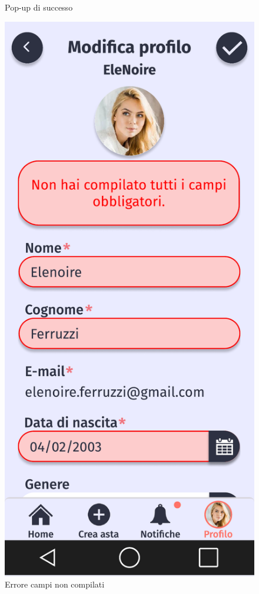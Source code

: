 \begin{figure}[!htb]
\begin{minipage}{0.32\textwidth}
                    \caption{Pop-up di successo}
            \end{minipage}\hfill
            \begin{minipage}{0.32\textwidth}
                    \centering
                    \includegraphics[width=.7\linewidth]{Immagini/Frames/Errori/E14.pdf}
                    \caption{Errore campi non compilati}
            \end{minipage}\hfill
        \end{figure}

